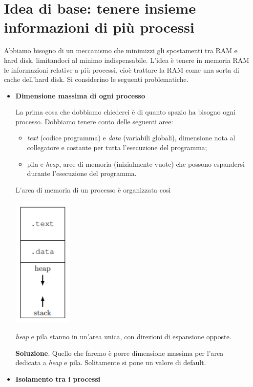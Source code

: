 \section{Idea di base: tenere insieme informazioni di più processi} Abbiamo bisogno di un meccanismo che minimizzi gli spostamenti tra RAM e hard disk, limitandoci al minimo indispensabile. L'idea è tenere in memoria RAM le informazioni relative a più processi, cioè trattare la RAM come una sorta di cache dell'hard disk. Si considerino le seguenti problematiche.
\begin{itemize}
	\item \textbf{Dimensione massima di ogni processo} 
	
	La prima cosa che dobbiamo chiederci è di quanto spazio ha bisogno ogni processo. Dobbiamo tenere conto delle seguenti aree:
	\begin{itemize}
		\item \emph{text} (codice programma) e \emph{data} (variabili globali), dimensione nota al collegatore e costante per tutta l'esecuzione del programma;
		\item pila e \emph{heap}, aree di memoria (inizialmente vuote) che possono espandersi durante l'esecuzione del programma.
	\end{itemize}
	L'area di memoria di un processo è organizzata così
	\begin{center}
		\includegraphics{img/208.PNG}
	\end{center}
	\emph{heap} e pila stanno in un'area unica, con direzioni di espansione opposte.  
	
	\noindent \textbf{Soluzione}. Quello che faremo è porre dimensione massima per l'area dedicata a \emph{heap} e pila. Solitamente si pone un valore di default. 
	
	\item \textbf{Isolamento tra i processi}	
	

\end{itemize}
